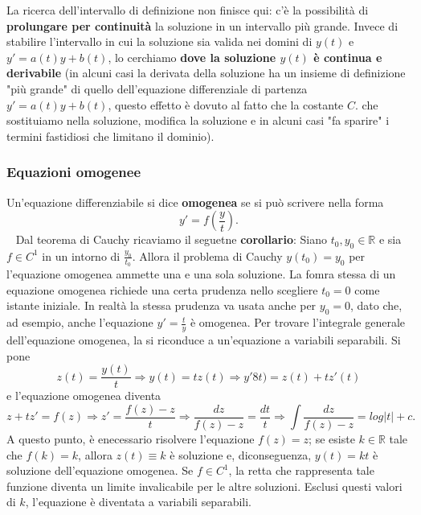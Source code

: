 \newline
\newline
La ricerca dell'intervallo di definizione non finisce qui: c'è la possibilità di \textbf{prolungare per continuità} la soluzione in un intervallo più grande. Invece di stabilire l'intervallo in cui la soluzione sia valida nei domini di $y(t)$ e $y' = a(t) y + b(t)$, lo cerchiamo \textbf{dove la soluzione $y(t)$ è continua e derivabile} (in alcuni casi la derivata della soluzione ha un insieme di definizione "più grande" di quello dell'equazione differenziale di partenza $y' = a(t)y + b(t)$, questo effetto è dovuto al fatto che la costante $C$. che sostituiamo nella soluzione, modifica la soluzione e in alcuni casi "fa sparire" i termini fastidiosi che limitano il dominio).
\subsubsection{Equazioni omogenee}
Un'equazione differenziabile si dice \textbf{omogenea} se si può scrivere nella forma
\[
    y'=f(\frac{y}{t}).
\]
\ \newline
Dal teorema di Cauchy ricaviamo il seguetne \textbf{corollario}:\newline
Siano $t_0, y_0 \in \mathbb{R}$ e sia $f \in C^1$ in un intorno di $\frac{y_0}{t_0}$. Allora il problema di Cauchy $y(t_0) = y_0$ per l'equazione omogenea ammette una e una sola soluzione.\newline
\newline
La fomra stessa di un equazione omogenea richiede una certa prudenza nello scegliere $t_0 = 0$ come istante iniziale. In realtà la stessa prudenza va usata anche per $y_0 = 0$, dato che, ad esempio, anche l'equazione $y'=\frac{t}{y}$ è omogenea.\newline
\newline
Per trovare l'integrale generale dell'equazione omogenea, la si riconduce a un'equazione a variabili separabili. Si pone
\[
    z(t) = \frac{y(t)}{t} \Rightarrow y(t) = t z(t) \Rightarrow y'8t) = z(t) + tz'(t)
\]
e l'equazione omogenea diventa
\[
    z + tz' = f(z) \Rightarrow  z' = \frac{f(z) -z}{t} \Rightarrow  \frac{dz}{f(z) - z} = \frac{dt}{t}
    \Rightarrow  \int \frac{dz}{f(z) -z} = log|t| + c.
\]
A questo punto, è enecessario risolvere l'equazione $f(z) = z$; se esiste $k \in \mathbb{R}$ tale che $f(k) = k$, allora $z(t) \equiv k$ è soluzione e, diconseguenza, $y(t) = kt$ è soluzione dell'equazione omogenea. Se $f \in C^1$, la retta che rappresenta tale funzione diventa un limite invalicabile per le altre soluzioni. Esclusi questi valori di $k$, l'equazione è diventata a variabili separabili.
